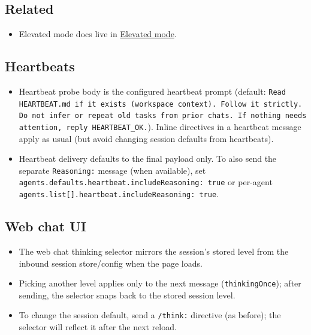 \subsection{Related}


\begin{itemize}
  \item Elevated mode docs live in \href{/tools/elevated}{Elevated mode}.
\end{itemize}


\subsection{Heartbeats}


\begin{itemize}
  \item Heartbeat probe body is the configured heartbeat prompt (default: \texttt{Read HEARTBEAT.md if it exists (workspace context). Follow it strictly. Do not infer or repeat old tasks from prior chats. If nothing needs attention, reply HEARTBEAT\_OK.}). Inline directives in a heartbeat message apply as usual (but avoid changing session defaults from heartbeats).
  \item Heartbeat delivery defaults to the final payload only. To also send the separate \texttt{Reasoning:} message (when available), set \texttt{agents.defaults.heartbeat.includeReasoning: true} or per-agent \texttt{agents.list[].heartbeat.includeReasoning: true}.
\end{itemize}


\subsection{Web chat UI}


\begin{itemize}
  \item The web chat thinking selector mirrors the session's stored level from the inbound session store/config when the page loads.
  \item Picking another level applies only to the next message (\texttt{thinkingOnce}); after sending, the selector snaps back to the stored session level.
  \item To change the session default, send a \texttt{/think:} directive (as before); the selector will reflect it after the next reload.
\end{itemize}



\clearpage

